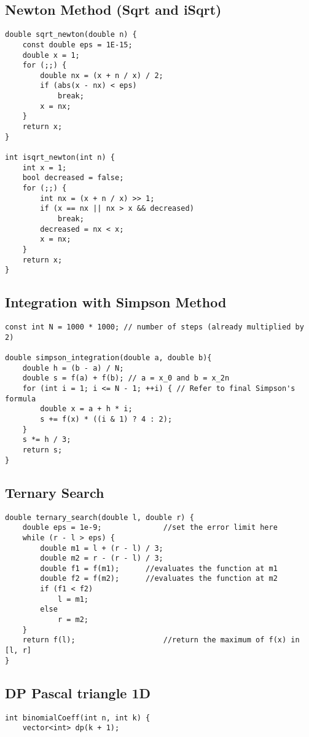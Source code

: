 \documentclass[10pt]{article}
\begin{document}
\begin{multicols*}{2}
\subsection{Newton Method (Sqrt and iSqrt)}
\begin{lstlisting}[style=compactcpp]
double sqrt_newton(double n) {
    const double eps = 1E-15;
    double x = 1;
    for (;;) {
        double nx = (x + n / x) / 2;
        if (abs(x - nx) < eps)
            break;
        x = nx;
    }
    return x;
}

int isqrt_newton(int n) {
    int x = 1;
    bool decreased = false;
    for (;;) {
        int nx = (x + n / x) >> 1;
        if (x == nx || nx > x && decreased)
            break;
        decreased = nx < x;
        x = nx;
    }
    return x;
}
\end{lstlisting}
\subsection{Integration with Simpson Method}
\begin{lstlisting}[style=compactcpp]
const int N = 1000 * 1000; // number of steps (already multiplied by 2)

double simpson_integration(double a, double b){
    double h = (b - a) / N;
    double s = f(a) + f(b); // a = x_0 and b = x_2n
    for (int i = 1; i <= N - 1; ++i) { // Refer to final Simpson's formula
        double x = a + h * i;
        s += f(x) * ((i & 1) ? 4 : 2);
    }
    s *= h / 3;
    return s;
}
\end{lstlisting}
\subsection{Ternary Search}
\begin{lstlisting}[style=compactcpp]
double ternary_search(double l, double r) {
    double eps = 1e-9;              //set the error limit here
    while (r - l > eps) {
        double m1 = l + (r - l) / 3;
        double m2 = r - (r - l) / 3;
        double f1 = f(m1);      //evaluates the function at m1
        double f2 = f(m2);      //evaluates the function at m2
        if (f1 < f2)
            l = m1;
        else
            r = m2;
    }
    return f(l);                    //return the maximum of f(x) in [l, r]
}
\end{lstlisting}
\subsection{DP Pascal triangle 1D}
\begin{lstlisting}[style=compactcpp]
int binomialCoeff(int n, int k) {
    vector<int> dp(k + 1);


\end{lstlisting}
\end{multicols*}
\end{document}
